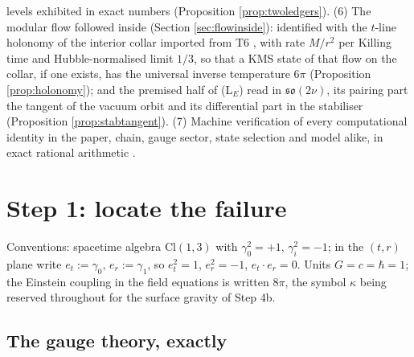 \documentclass[11pt]{article}
\theoremstyle{definition}
\newcommand{\Cl}{\mathrm{Cl}}
\newcommand{\er}{e_r}
\newcommand{\et}{e_t}
\begin{document}
levels exhibited in exact numbers (Proposition \ref{prop:twoledgers}). (6) The modular flow followed inside (Section \ref{sec:flowinside}): identified with the $t$-line holonomy of the interior collar imported from T6 \cite{ButlerT6}, with rate $M/r^2$ per Killing time and Hubble-normalised limit $1/3$, so that a KMS state of that flow on the collar, if one exists, has the universal inverse temperature $6\pi$ (Proposition \ref{prop:holonomy}); and the premised half of (L$_E$) read in $\mathfrak{so}(2\nu)$, its pairing part the tangent of the vacuum orbit and its differential part in the stabiliser (Proposition \ref{prop:stabtangent}). (7) Machine verification of every computational identity in the paper, chain, gauge sector, state selection and model alike, in exact rational arithmetic \cite{ButlerVerifyT05}.


\section{Step 1: locate the failure}\label{sec:locate}

Conventions: spacetime algebra $\Cl(1,3)$ with $\gamma_0^2 = +1$, $\gamma_i^2 = -1$; in the $(t,r)$ plane write $\et := \gamma_0$, $\er := \gamma_1$, so $\et^2 = 1$, $\er^2 = -1$, $\et \cdot \er = 0$. Units $G = c = \hbar = 1$; the Einstein coupling in the field equations is written $8\pi$, the symbol $\kappa$ being reserved throughout for the surface gravity of Step 4b.

\subsection{The gauge theory, exactly}\label{subsec:gtg}
\end{document}
